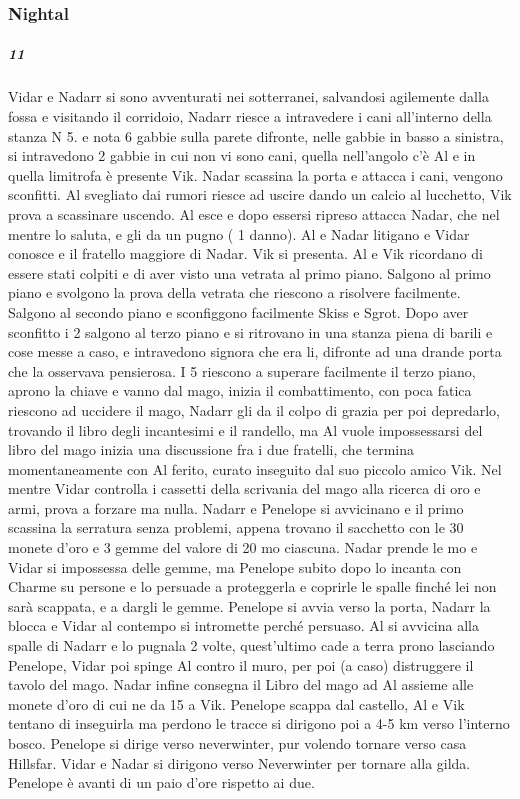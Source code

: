 \documentclass{article}
\begin{document}
\subsubsection{Nightal}
\subparagraph{11}
Vidar e Nadarr si sono avventurati nei sotterranei, salvandosi agilemente dalla fossa e visitando il corridoio, Nadarr riesce a intravedere i cani all'interno della stanza N 5. e nota 6 gabbie sulla parete difronte, nelle gabbie in basso a sinistra, si intravedono 2 gabbie in cui non vi sono cani, quella nell'angolo c'è Al e in quella limitrofa è presente Vik. Nadar scassina la porta e attacca i cani, vengono sconfitti. Al svegliato dai rumori riesce ad uscire dando un calcio al lucchetto, Vik prova a scassinare uscendo. Al esce e dopo essersi ripreso attacca Nadar, che nel mentre lo saluta, e gli da un pugno ( 1 danno). Al e Nadar litigano e Vidar conosce e il fratello maggiore di Nadar. Vik si presenta. Al e Vik ricordano di essere stati colpiti e di aver visto una vetrata al primo piano. Salgono al primo piano e svolgono la prova della vetrata che riescono a risolvere facilmente. Salgono al secondo piano e sconfiggono facilmente Skiss e Sgrot. Dopo aver sconfitto i 2 salgono al terzo piano e si ritrovano in una stanza piena di barili e cose messe a caso, e intravedono signora che era li, difronte ad una drande porta che la osservava pensierosa. I 5 riescono a superare facilmente il terzo piano, aprono la chiave e vanno dal mago, inizia il combattimento, con poca fatica riescono ad uccidere il mago, Nadarr gli da il colpo di grazia per poi depredarlo, trovando il libro degli incantesimi e il randello, ma Al vuole impossessarsi del libro del mago inizia una discussione fra i due fratelli, che termina momentaneamente con Al ferito, curato inseguito dal suo piccolo amico Vik. Nel mentre Vidar controlla i cassetti della scrivania del mago alla ricerca di oro e armi, prova a forzare ma nulla. Nadarr e Penelope si avvicinano e il primo scassina la serratura senza problemi, appena trovano il sacchetto con le 30 monete d'oro e 3 gemme del valore di 20 mo ciascuna. Nadar prende le mo e Vidar si impossessa delle gemme, ma Penelope subito dopo lo incanta con Charme su persone e lo persuade a proteggerla e coprirle le spalle finché lei non sarà scappata, e a dargli le gemme. Penelope si avvia verso la porta, Nadarr la blocca e Vidar al contempo si intromette perché persuaso. Al si avvicina alla spalle di Nadarr e lo pugnala 2 volte, quest'ultimo cade a terra prono lasciando Penelope, Vidar poi spinge Al contro il muro, per poi (a caso) distruggere il tavolo del mago. Nadar infine consegna il Libro del mago ad Al assieme alle monete d'oro di cui ne da 15 a Vik. Penelope scappa dal castello, Al e Vik tentano di inseguirla ma perdono le tracce si dirigono poi a 4-5 km verso l'interno bosco. Penelope si dirige verso neverwinter, pur volendo tornare verso casa Hillsfar. Vidar e Nadar si dirigono verso Neverwinter per tornare alla gilda. Penelope è avanti di un paio d'ore rispetto ai due. 
\end{document}
